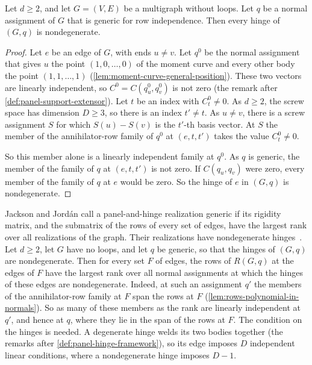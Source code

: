\begin{lemma}
  \label{lem:generic-normals-nondegenerate}
  \leanok
  Let $d \ge 2$, and let $G = (V, E)$ be a multigraph without loops.
  Let $q$ be a normal assignment of $G$ that is generic for row
  independence. Then every hinge of $(G, q)$ is nondegenerate.
\end{lemma}
\begin{proof}
  \leanok
  Let $e$ be an edge of $G$, with ends $u \neq v$. Let $q^0$ be the
  normal assignment that gives $u$ the point $(1, 0, \dots, 0)$ of the
  moment curve and every other body the point $(1, 1, \dots, 1)$
  (\cref{lem:moment-curve-general-position}). These two vectors are
  linearly independent, so $C^0 = C(q^0_u, q^0_v)$ is not zero (the
  remark after \cref{def:panel-support-extensor}). Let $t$ be an index
  with $C^0_t \neq 0$. As $d \ge 2$, the screw space has dimension
  $D \ge 3$, so there is an index $t' \neq t$. As $u \neq v$, there is
  a screw assignment $S$ for which $S(u) - S(v)$ is the $t'$-th basis
  vector. At $S$ the member of the annihilator-row family of $q^0$ at
  $(e, t, t')$ takes the value $C^0_t \neq 0$.

  So this member alone is a linearly independent family at $q^0$. As
  $q$ is generic, the member of the family of $q$ at $(e, t, t')$ is
  not zero. If $C(q_u, q_v)$ were zero, every member of the family of
  $q$ at $e$ would be zero. So the hinge of $e$ in $(G, q)$ is
  nondegenerate.
\end{proof}

Jackson and Jord\'an call a panel-and-hinge realization generic if its
rigidity matrix, and the submatrix of the rows of every set of edges,
have the largest rank over all realizations of the graph. Their
realizations have nondegenerate
hinges~\cite[\S7]{jacksonJordan2009}. Let $d \ge 2$, let $G$ have no
loops, and let $q$ be generic, so that the hinges of $(G, q)$ are
nondegenerate. Then for every set $F$ of edges, the rows of
$R(G, q)$ at the edges of $F$ have the largest rank over all normal
assignments at which the hinges of these edges are nondegenerate.
Indeed, at such an assignment $q'$ the members of
the annihilator-row family at $F$ span the rows at $F$
(\cref{lem:rows-polynomial-in-normals}). So as many of these members
as the rank are linearly independent at $q'$, and hence at $q$, where
they lie in the span of the rows at $F$. The condition on the hinges
is needed. A degenerate hinge welds its two bodies together (the
remarks after \cref{def:panel-hinge-framework}), so its edge imposes
$D$ independent linear conditions, where a nondegenerate hinge imposes
$D - 1$.

